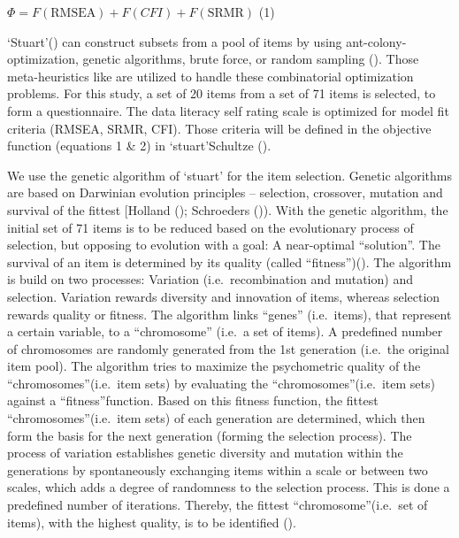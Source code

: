 \documentclass[
  12pt,
  a4paper,
  twoside]{article}
\begin{document}
\begin{center}
$\Phi = F(\textrm{RMSEA}) + F(CFI)+ F(\textrm{SRMR}) $ (1)
\end{center}

`Stuart'() can construct subsets from a pool of items by using ant-colony-optimization, genetic algorithms, brute force, or random sampling (). Those meta-heuristics like are utilized to handle these combinatorial optimization problems.
For this study, a set of 20 items from a set of 71 items is selected, to form a questionnaire. The data literacy self rating scale is optimized for model fit criteria (RMSEA, SRMR, CFI). Those criteria will be defined in the objective function (equations 1 \& 2) in `stuart'Schultze ().

We use the genetic algorithm of `stuart' for the item selection. Genetic algorithms are based on Darwinian evolution principles -- selection, crossover, mutation and survival of the fittest {[}Holland (); Schroeders ()). With the genetic algorithm, the initial set of 71 items is to be reduced based on the evolutionary process of selection, but opposing to evolution with a goal: A near-optimal ``solution''. The survival of an item is determined by its quality (called ``fitness'')(). The algorithm is build on two processes: Variation (i.e.~recombination and mutation) and selection. Variation rewards diversity and innovation of items, whereas selection rewards quality or fitness. The algorithm links ``genes'' (i.e.~items), that represent a certain variable, to a ``chromosome'' (i.e.~a set of items). A predefined number of chromosomes are randomly generated from the 1st generation (i.e.~the original item pool). The algorithm tries to maximize the psychometric quality of the ``chromosomes''(i.e.~item sets) by evaluating the ``chromosomes''(i.e.~item sets) against a ``fitness''function. Based on this fitness function, the fittest ``chromosomes''(i.e.~item sets) of each generation are determined, which then form the basis for the next generation (forming the selection process). The process of variation establishes genetic diversity and mutation within the generations by spontaneously exchanging items within a scale or between two scales, which adds a degree of randomness to the selection process. This is done a predefined number of iterations. Thereby, the fittest ``chromosome''(i.e.~set of items), with the highest quality, is to be identified ().
\end{document}
